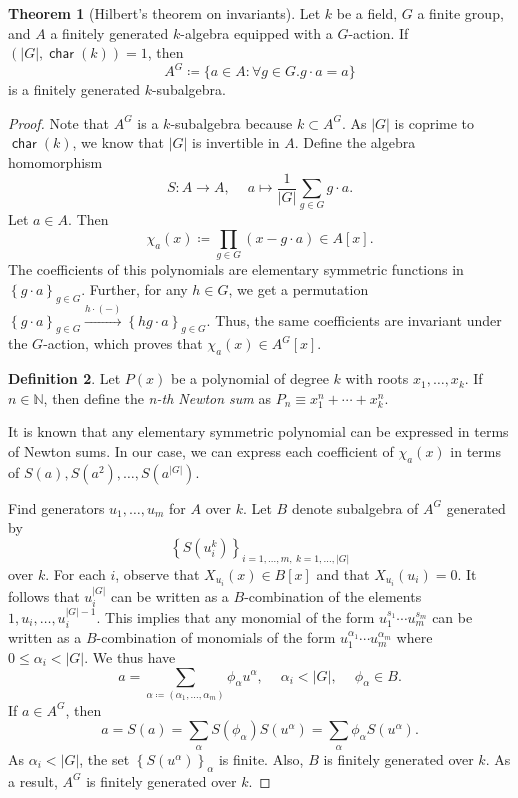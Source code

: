 \documentclass[10pt,letterpaper,cm]{nupset}
\theoremstyle{definition}
\newtheorem{definition}{Definition}[subsection]
\theoremstyle{theorem}
\newtheorem{theorem}[definition]{Theorem}
\theoremstyle{remark}
\newcommand{\N}{\mathbb N}
\newcommand{\1}{\mathbf{1}}
\newcommand{\0}{\vec 0}
\DeclareMathOperator{\Char}{\mathsf{char}}
\begin{document}
\begin{theorem}[Hilbert's theorem on invariants]
Let $k$ be a field, $G$ a finite group, and $A$ a finitely generated $k$-algebra equipped with a $G$-action. If $\left(\left\lvert{G}\right\rvert, \Char(k)\right)=1$, then $$A^G\coloneqq  \{ a \in A: \forall g \in G.g\cdot a =a\}$$ is a finitely generated $k$-subalgebra. 
\end{theorem}
\begin{proof}
Note that $A^G$ is a $k$-subalgebra because $k\subset A^G$. As $\left\lvert{G}\right\rvert$ is coprime to $\Char(k)$, we know that $\left\lvert{G}\right\rvert$ is invertible in $A$. Define the algebra homomorphism $$S: A \to A,\ \quad a \mapsto \frac{1}{\left\lvert{G}\right\rvert}\sum_{g\in G}g\cdot a   .$$ Let $a\in A$. Then $$\chi_a(x)\coloneqq  \prod_{g\in G}(x-g\cdot a)\in A\left[x\right].$$ The coefficients of this polynomials are elementary symmetric functions in $\left\{g\cdot a\right\}_{g\in G}$. Further, for any $h\in G$, we get a permutation $\left\{g\cdot a\right\}_{g\in G} \overset{h\cdot (-)}{\longrightarrow} \left\{h g\cdot a\right\}_{g\in G}$. Thus, the same coefficients are invariant under the $G$-action, which proves that $\chi_a(x) \in A^G\left[x\right]$. 
\begin{definition}
Let $P(x)$ be a polynomial of degree $k$ with roots $x_1, \ldots, x_k$. If $n\in \N$, then define the \textit{n-th Newton sum} as $P_n \equiv x_1^n + \cdots + x_k^n$.
\end{definition}
It is known that any elementary symmetric polynomial can be expressed in terms of Newton sums. In our case, we can express each coefficient of $\chi_a(x)$ in terms of $S(a), S(a^2) , \ldots, S\left(a^{\left\lvert{G}\right\rvert}\right)$.

Find generators $u_1, \ldots, u_m$ for $A$ over $k$. Let $B$ denote subalgebra of $A^G$ generated by $$\left\{S\left(u_i^k\right)\right\}_{i=1, \ldots, m,\ k=1, \ldots, \left\lvert{G}\right\rvert}$$ over $k$. For each $i$, observe that $X_{u_i}(x) \in B\left[x\right]$ and that $X_{u_i}(u_i) =0$. It follows that $u_i^{\left\lvert{G}\right\rvert}$ can be written as a $B$-combination of the elements $1, u_i, \ldots, u_i^{\left\lvert{G}\right\rvert-1}$. This implies that any monomial of the form $u_1^{s_1}\cdots u_m^{s_m}$ can be written as a $B$-combination of monomials of the form $u_1^{\alpha_1}\cdots u_m^{\alpha_m}$ where $0\leq \alpha_i <\left\lvert{G}\right\rvert$. We thus have $$a= \sum_{\alpha\coloneqq  (\alpha_1, \ldots, \alpha_m)}\phi_{\alpha}u^{\alpha},\ \quad \alpha_i < \left\lvert{G}\right\rvert,\ \quad \phi_{\alpha} \in B.   $$ If $a\in A^G$, then $$a=S(a) = \sum_{\alpha}S(\phi_{\alpha})S(u^{\alpha}) = \sum_{\alpha} \phi_{\alpha}S(u^{\alpha}).$$ As  $\alpha_i<\left\lvert{G}\right\rvert$,  the set $\left\{S(u^{\alpha})\right\}_{\alpha}$ is finite. Also, $B$ is finitely generated over $k$. As a result, $A^G$ is finitely generated over $k$. 
\end{proof}
\end{document}
